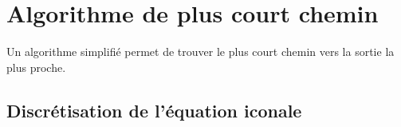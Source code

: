 
\section{Algorithme de plus court chemin}
%
Un algorithme simplifié permet de trouver le plus court chemin vers la sortie la plus proche.
%
\subsection{Discrétisation de l'équation iconale}
%
